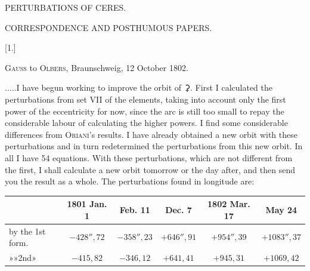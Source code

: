 \clearpage
\thispagestyle{empty}
\vspace*{1.6in}
\begin{center}{\Large PERTURBATIONS OF CERES.\par}\end{center}
\clearpage
{}
\begin{center}
{\large CORRESPONDENCE AND POSTHUMOUS PAPERS.\par}
\par
[OCTOBER—DECEMBER 1802.]\par
\bigskip
{}[1.]\par
\medskip
\textsc{Gauss} to \textsc{Olbers}, Braunschweig, 12 October 1802.
\end{center}
\noindent\hspace*{\parindent}.\quad.\quad.\quad.\quad.\quad I have begun working to improve the orbit of {\AstroSymbols ⚳}. First I calculated the perturbations from set VII of the elements, taking into account only the first power of the eccentricity for now, since the arc is still too small to repay the considerable labour of calculating the higher powers. I find some considerable differences from \textsc{Oriani}'s results. I have already obtained a new orbit with these perturbations and in turn redetermined the perturbations from this new orbit. In all I have 54 equations. With these perturbations, which are not  different from the first, I shall calculate a new orbit tomorrow or the day after, and then send you the result as a whole. The perturbations found in longitude are:
\begin{center}
\begingroup\footnotesize\setlength{\tabcolsep}{4pt}\renewcommand{\arraystretch}{1.25}
\begin{tabular}{l|c|c|c|c|c}
 & 1801 Jan. 1 & Feb. 11 & Dec. 7 & 1802 Mar. 17 & May 24\\
\hline
by the 1st form. & \(-428''{,}72\) & \(-358''{,}23\) & \(+646''{,}91\) & \(+954''{,}39\) & \(+1083''{,}37\)\\
»\quad »\quad 2nd\quad » & \(-415{,}82\) & \(-346{,}12\) & \(+641{,}41\) & \(+945{,}31\) & \(+1069{,}42\)\\
\end{tabular}\endgroup
\end{center}
